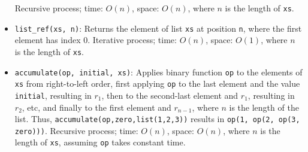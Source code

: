\begin{itemize}
Recursive process;
time: $O(n)$, space: $O(n)$, where $n$ is the length of \lstinline{xs}.
\item \lstinline{list_ref(xs, n)}: Returns the element
of list \lstinline{xs} at position \lstinline{n}, 
where the first element has index 0.
Iterative process;
time: $O(n)$, space: $O(1)$, where $n$ is the length of \lstinline{xs}.
\item \lstinline{accumulate(op, initial, xs)}: Applies binary
function \lstinline{op} to the elements of \lstinline{xs} from
right-to-left order, first applying \lstinline{op} to the last element
and the value \lstinline{initial}, resulting in $r_1$, then to the 
second-last element and $r_1$, resulting in $r_2$, etc, and finally
to the first element and $r_{n-1}$, where $n$ is the length of the
list. Thus, \lstinline{accumulate(op,zero,list(1,2,3))} results in
\lstinline{op(1, op(2, op(3, zero)))}.
Recursive process;
time: $O(n)$, space: $O(n)$, where $n$ is the length of \lstinline{xs},
assuming \lstinline{op} takes constant time.
\end{itemize}
